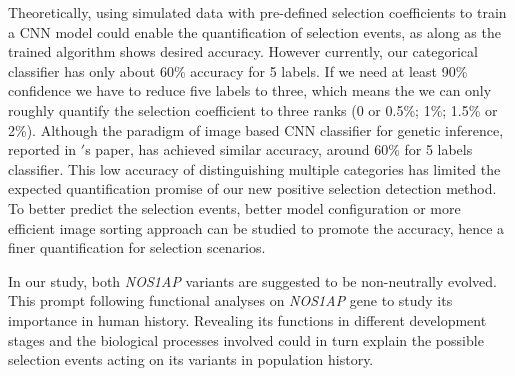\documentclass[a4paper,12pt,oneside]{extarticle}
\begin{document}
Theoretically, using simulated data with pre-defined selection coefficients to train a CNN model could enable the quantification of selection events, as along as the trained algorithm shows desired accuracy. However currently, our categorical classifier has only about 60\% accuracy for 5 labels. If we need at least 90\% confidence we have to reduce five labels to three, which means the we can only roughly quantify the selection coefficient to three ranks (0 or 0.5\%; 1\%; 1.5\% or 2\%). Although the paradigm of image based CNN classifier for genetic inference, reported in \cite{17}$'$s paper, has achieved similar accuracy, around 60\% for 5 labels classifier. This low accuracy of distinguishing multiple categories has limited the expected quantification promise of our new positive selection detection method. To better predict the selection events, better model configuration or more efficient image sorting approach can be studied to promote the accuracy, hence a finer quantification for selection scenarios.
\par
In our study, both \textit{NOS1AP} variants are suggested to be non-neutrally evolved. This prompt following functional analyses on \textit{NOS1AP} gene to study its importance in human history. Revealing its functions in different development stages and the biological processes involved could in turn explain the possible selection events acting on its variants in population history.




\cleardoublepage\clearpage





\end{document}
